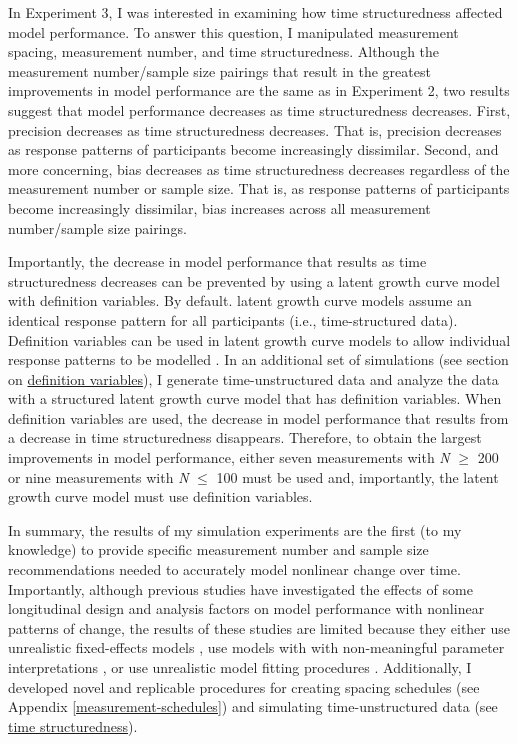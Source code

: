 \documentclass[
12pt, %
twoside,
english]{guelphthesis}
\begin{document}
In Experiment 3, I was interested in examining how time structuredness affected model performance. To answer this question, I manipulated measurement spacing, measurement number, and time structuredness. Although the measurement number/sample size pairings that result in the greatest improvements in model performance are the same as in Experiment 2, two results suggest that model performance decreases as time structuredness decreases. First, precision decreases as time structuredness decreases. That is, precision decreases as response patterns of participants become increasingly dissimilar. Second, and more concerning, bias decreases as time structuredness decreases regardless of the measurement number or sample size. That is, as response patterns of participants become increasingly dissimilar, bias increases across all measurement number/sample size pairings.

Importantly, the decrease in model performance that results as time structuredness decreases can be prevented by using a latent growth curve model with definition variables. By default. latent growth curve models assume an identical response pattern for all participants (i.e., time-structured data). Definition variables can be used in latent growth curve models to allow individual response patterns to be modelled \autocite{mehta2000,mehta2005}. In an additional set of simulations (see section on \protect\hyperlink{def-variables}{definition variables}), I generate time-unstructured data and analyze the data with a structured latent growth curve model that has definition variables. When definition variables are used, the decrease in model performance that results from a decrease in time structuredness disappears. Therefore, to obtain the largest improvements in model performance, either seven measurements with \emph{N} \(\ge\) 200 or nine measurements with \emph{N} \(\le\) 100 must be used and, importantly, the latent growth curve model must use definition variables.

In summary, the results of my simulation experiments are the first (to my knowledge) to provide specific measurement number and sample size recommendations needed to accurately model nonlinear change over time. Importantly, although previous studies have investigated the effects of some longitudinal design and analysis factors on model performance with nonlinear patterns of change, the results of these studies are limited because they either use unrealistic fixed-effects models \autocite[e.g.,][]{finch2017}, use models with with non-meaningful parameter interpretations \autocites[e.g.,][]{fine2019,liu2022}, or use unrealistic model fitting procedures \autocite{finch2017}. Additionally, I developed novel and replicable procedures for creating spacing schedules (see Appendix \ref{measurement-schedules}) and simulating time-unstructured data (see \protect\hyperlink{simulating-time-struc}{time structuredness}).
\end{document}
